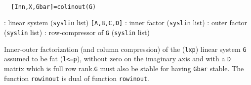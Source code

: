 \begin{mandesc}
   \\ %
\end{mandesc}
\begin{calling_sequence}
\begin{verbatim}
  [Inn,X,Gbar]=colinout(G)  
\end{verbatim}
\end{calling_sequence}
\begin{parameters}
  \begin{varlist}
    : linear system (\verb!syslin! list) \verb![A,B,C,D]!
    :  inner factor (\verb!syslin! list)
    :  outer factor (\verb!syslin! list)
    :  row-compressor of \verb!G! (\verb!syslin! list)
  \end{varlist}
\end{parameters}
\begin{mandescription}
  Inner-outer factorization (and column compression) of the (\verb!lxp!) 
  linear system \verb!G! assumed to be fat (\verb!l<=p!), 
  without zero on the imaginary axis and with a \verb!D! matrix which is full
  row rank.\verb!G! must also be stable for having \verb!Gbar! stable. 
  The function \verb!rowinout! is dual of function \verb!rowinout!.
\end{mandescription}
\begin{manseealso}
     
\end{manseealso}
